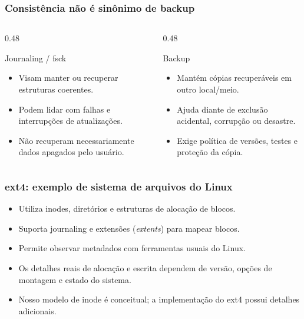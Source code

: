 \documentclass[aspectratio=169,11pt]{beamer}
\begin{document}
\begin{frame}
\frametitle{Consistência não é sinônimo de backup}
\begin{columns}[T,onlytextwidth]
\begin{column}{0.48\textwidth}
\begin{block}{Journaling / fsck}\small\begin{itemize}
\item Visam manter ou recuperar estruturas coerentes.
\item Podem lidar com falhas e interrupções de atualizações.
\item Não recuperam necessariamente dados apagados pelo usuário.
\end{itemize}\end{block}\end{column}
\begin{column}{0.48\textwidth}
\begin{block}{Backup}\small\begin{itemize}
\item Mantém cópias recuperáveis em outro local/meio.
\item Ajuda diante de exclusão acidental, corrupção ou desastre.
\item Exige política de versões, testes e proteção da cópia.
\end{itemize}\end{block}\end{column}\end{columns}

\end{frame}

\begin{frame}
\frametitle{ext4: exemplo de sistema de arquivos do Linux}
\large
\begin{itemize}
\item Utiliza inodes, diretórios e estruturas de alocação de blocos.
\item Suporta journaling e extensões (\textit{extents}) para mapear blocos.
\item Permite observar metadados com ferramentas usuais do Linux.
\item Os detalhes reais de alocação e escrita dependem de versão, opções de montagem e estado do sistema.
\item Nosso modelo de inode é conceitual; a implementação do ext4 possui detalhes adicionais.
\end{itemize}

\end{frame}
\end{document}
